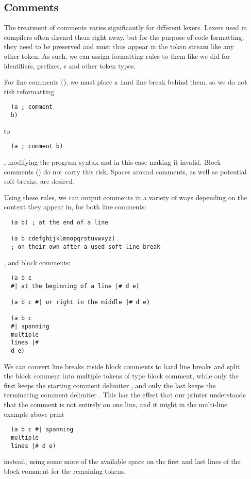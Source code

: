 \subsection{Comments}
The treatment of comments varies significantly for different lexers.
Lexers used in compilers often discard them right away,
but for the purpose of code formatting, they need to be preserved
and must thus appear in the token stream like any other token.
As such, we can assign formatting rules to them like we did for
identifiers, prefixes, s and other token types.

For line comments (\code{;}), we must place a hard line break behind them,
so we do not risk reformatting
\begin{verbatim}
  (a ; comment
  b)
\end{verbatim}
to
\begin{verbatim}
  (a ; comment b)
\end{verbatim}
, modifying the program syntax and in this case making it invalid.
Block comments (\code{#| |#}) do not carry this risk.
Spaces around comments, as well as potential soft breaks, are desired.

Using these rules, we can output comments in a variety of ways
depending on the context they appear in, for both line comments:
\begin{verbatim}
  (a b) ; at the end of a line

  (a b cdefghijklmnopqrstuvwxyz)
  ; on their own after a used soft line break
\end{verbatim}
, and block comments:
\begin{verbatim}
  (a b c
  #| at the beginning of a line |# d e)

  (a b c #| or right in the middle |# d e)

  (a b c
  #| spanning
  multiple
  lines |#
  d e)
\end{verbatim}

We can convert line breaks inside block comments to hard line breaks
and split the block comment into multiple tokens of type block comment,
while only the first keeps the starting comment delimiter \code{#|},
and only the last keeps the terminating comment delimiter \code{|#}.
This has the effect that our printer understands that the comment
is not entirely on one line, and it might in the multi-line example above print
\begin{verbatim}
  (a b c #| spanning
  multiple
  lines |# d e)
\end{verbatim}
instead, using some more of the available space
on the first and last lines of the block comment for the remaining tokens.

